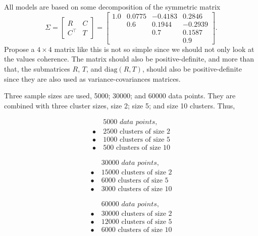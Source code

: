 All models are based on some decomposition of the symmetric matrix
\[
 \Sigma = \begin{bmatrix} R & C\\ C^{\top} & T \end{bmatrix}
        = \begin{bmatrix}
            1.0    &  0.0775 & -0.4183 &  0.2846\\
                   &  0.6    &  0.1944 & -0.2939\\
                   &         &  0.7    &  0.1587\\
                   &         &         &  0.9
          \end{bmatrix}.
\]
Propose a \(4\times4\) matrix like this is not so simple since we should
not only look at the values coherence. The matrix should also be
positive-definite, and more than that, the submatrices \(R\), \(T\),
and \(\text{diag}(R, T)\), should also be positive-definite since they
are also used as variance-covariances matrices.

Three sample sizes are used, 5000; 30000; and 60000 data points. They
are combined with three cluster sizes, size 2; size 5; and size 10
clusters. Thus,
\begin{minipage}{\textwidth/3}
 \begin{align*}
          &\textit{5000 data points},\\
  \bullet~&\text{2500 clusters of size 2}\\
  \bullet~&\text{1000 clusters of size 5}\\
  \bullet~&\text{500 clusters of size 10}
 \end{align*}
\end{minipage}%
\begin{minipage}{\textwidth/3}
 \begin{align*}
          &\textit{30000 data points},\\
  \bullet~&\text{15000 clusters of size 2}\\
  \bullet~&\text{6000 clusters of size 5}\\
  \bullet~&\text{3000 clusters of size 10}
 \end{align*}
\end{minipage}%
\begin{minipage}{\textwidth/3}
 \begin{align*}
          &\textit{60000 data points},\\
  \bullet~&\text{30000 clusters of size 2}\\
  \bullet~&\text{12000 clusters of size 5}\\
  \bullet~&\text{6000 clusters of size 10}
 \end{align*}
\end{minipage}\\


